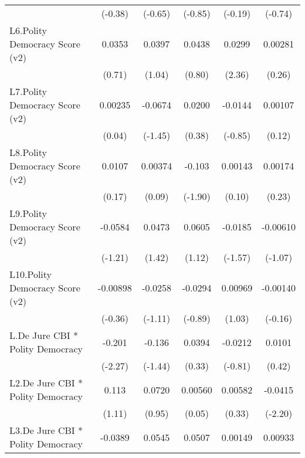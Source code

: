 {\begin{longtable}{l*{5}{c}}
                &  (-0.38)         &  (-0.65)         &  (-0.85)         &  (-0.19)         &  (-0.74)         \\
[1em]
L6.Polity Democracy Score (v2)&   0.0353         &   0.0397         &   0.0438         &   0.0299\sym{*}  &  0.00281         \\
                &   (0.71)         &   (1.04)         &   (0.80)         &   (2.36)         &   (0.26)         \\
[1em]
L7.Polity Democracy Score (v2)&  0.00235         &  -0.0674         &   0.0200         &  -0.0144         &  0.00107         \\
                &   (0.04)         &  (-1.45)         &   (0.38)         &  (-0.85)         &   (0.12)         \\
[1em]
L8.Polity Democracy Score (v2)&   0.0107         &  0.00374         &   -0.103         &  0.00143         &  0.00174         \\
                &   (0.17)         &   (0.09)         &  (-1.90)         &   (0.10)         &   (0.23)         \\
[1em]
L9.Polity Democracy Score (v2)&  -0.0584         &   0.0473         &   0.0605         &  -0.0185         & -0.00610         \\
                &  (-1.21)         &   (1.42)         &   (1.12)         &  (-1.57)         &  (-1.07)         \\
[1em]
L10.Polity Democracy Score (v2)& -0.00898         &  -0.0258         &  -0.0294         &  0.00969         & -0.00140         \\
                &  (-0.36)         &  (-1.11)         &  (-0.89)         &   (1.03)         &  (-0.16)         \\
[1em]
L.De Jure CBI * Polity Democracy&   -0.201\sym{*}  &   -0.136         &   0.0394         &  -0.0212         &   0.0101         \\
                &  (-2.27)         &  (-1.44)         &   (0.33)         &  (-0.81)         &   (0.42)         \\
[1em]
L2.De Jure CBI * Polity Democracy&    0.113         &   0.0720         &  0.00560         &  0.00582         &  -0.0415\sym{*}  \\
                &   (1.11)         &   (0.95)         &   (0.05)         &   (0.33)         &  (-2.20)         \\
[1em]
L3.De Jure CBI * Polity Democracy&  -0.0389         &   0.0545         &   0.0507         &  0.00149         &  0.00933         \\

\end{longtable}}
